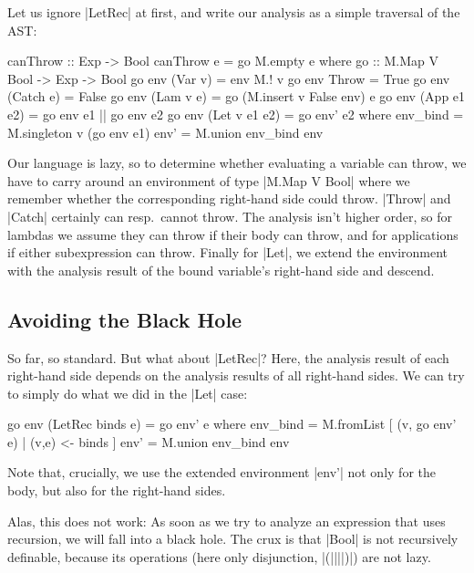 \documentclass[manuscript,screen,acmsmall,nonacm]{acmart}
\begin{document}
Let us ignore |LetRec| at first, and write our analysis as a simple traversal of the AST:
\nopagebreak
\savecolumns
\begin{code}
canThrow :: Exp -> Bool
canThrow e = go M.empty e
  where
    go :: M.Map V Bool -> Exp -> Bool
    go env (Var v)        = env M.! v
    go env Throw          = True
    go env (Catch e)      = False
    go env (Lam v e)      = go (M.insert v False env) e
    go env (App e1 e2)    = go env e1 || go env e2
    go env (Let v e1 e2)  = go env' e2
      where
        env_bind  = M.singleton v (go env e1)
        env'      = M.union env_bind env
\end{code}

Our language is lazy, so to determine whether evaluating a variable can throw,
we have to carry around an
environment of type |M.Map V Bool| where we remember whether the corresponding right-hand side could throw. |Throw| and |Catch| certainly can resp.\ cannot throw. The analysis isn't higher order, so for lambdas we assume they can throw if their body can throw, and for applications if either subexpression can throw. Finally for |Let|, we extend the environment with the analysis result of the bound variable's right-hand side and descend.

\subsection{Avoiding the Black Hole}
So far, so standard. But what about |LetRec|? Here, the analysis result of each right-hand side depends on the analysis results of all right-hand sides. We can try to simply do what we did in the |Let| case:
\restorecolumns
\begin{code}
    go env (LetRec binds e) = go env' e
      where
        env_bind  = M.fromList [ (v, go env' e) | (v,e) <- binds ]
        env'      = M.union env_bind env
\end{code}
Note that, crucially, we use the extended environment |env'| not only for the body, but also for the right-hand sides.

Alas, this does not work: As soon as we try to analyze an expression that uses recursion, we will fall into a black hole. The crux is that |Bool| is not recursively definable, because its operations (here only disjunction, |(||||)|) are not lazy.
\end{document}
